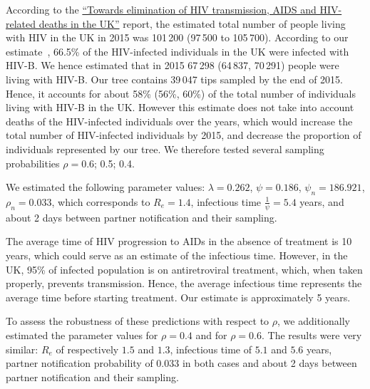 \documentclass[a4paper,10pt]{article}
\begin{document}
According to the \href{https://webarchive.nationalarchives.gov.uk/ukgwa/20181112132123mp_/https://assets.publishing.service.gov.uk/government/uploads/system/uploads/attachment_data/file/602942/HIV_in_the_UK_report.pdf}{``Towards elimination of HIV transmission, AIDS and HIV-related deaths in the UK''}
 report, the estimated total number of people living with HIV in the UK in 2015 was 101\,200 (97\,500 to 105\,700). %
According to our estimate~\citep{zhukovaModelingDrugResistance2023}, 66.5\% of the HIV-infected individuals in the UK were infected with HIV-B. We hence estimated that in 2015 67\,298 (64\,837, 70\,291) people were living with HIV-B. Our tree contains 39\,047 tips sampled by the end of 2015. Hence, it accounts for about 58\% (56\%, 60\%) of the total number of individuals living with HIV-B in the UK. However this estimate does not take into account deaths of the HIV-infected individuals over the years, which would increase the total number of HIV-infected individuals by 2015, and decrease the proportion of individuals represented by our tree. We therefore tested several sampling probabilities $\rho=$0.6; 0.5; 0.4.
 
 
 We estimated the following parameter values: $\lambda=0.262$, $\psi=0.186$, $\psi_n=186.921$, $\rho_n=0.033$, which corresponds to $R_e = 1.4$, infectious time $\frac{1}{\psi} = 5.4$ years, and about 2 days between partner notification and their sampling.
 
The average time of HIV progression to AIDs in the absence of treatment is 10 years, which could serve as an estimate of the infectious time. However, in the UK, 95\% of infected population is on antiretroviral treatment, which, when taken properly, prevents transmission. Hence, the average infectious time represents the average time before starting treatment. Our estimate is approximately 5 years. 

To assess the robustness of these predictions with respect to $\rho$, we additionally estimated the parameter values for $\rho=0.4$ and for $\rho=0.6$. The results were very similar: $R_e$ of respectively $1.5$ and 
$1.3$, infectious time of $5.1$ and $5.6$ years, partner notification probability of $0.033$ in both cases and about 2 days between partner notification and their sampling.
\end{document}
